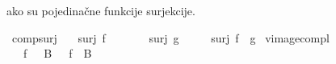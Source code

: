 \begin{isabellebody}
\begin{exercise}[subtitle=Svojstva funkcija]
\begin{isamarkuptext}
      ako su pojedinačne funkcije surjekcije.%
\end{isamarkuptext}\isamarkuptrue%
\isamarkupfalse%
\ comp{\isacharunderscore}{\kern0pt}surj{\isacharcolon}{\kern0pt}\isanewline
\ \ \ {\isachardoublequoteopen}surj\ f{\isachardoublequoteclose}\isanewline
\ \ \ \ \ \ \ {\isachardoublequoteopen}surj\ g{\isachardoublequoteclose}\isanewline
\ \ \ \ \ {\isachardoublequoteopen}surj\ {\isacharparenleft}{\kern0pt}f\ {\isasymcirc}\ g{\isacharparenright}{\kern0pt}{\isachardoublequoteclose}%
\isadelimproof
%
\endisadelimproof
%
\isatagproof
%
\endisatagproof
{\isafoldproof}%
%
\isadelimproof
%
\endisadelimproof
\isanewline
{}\isamarkupfalse%
\ vimage{\isacharunderscore}{\kern0pt}compl{\isacharcolon}{\kern0pt}\ \isanewline
\ \ \ {\isachardoublequoteopen}f\ {\isacharminus}{\kern0pt}{\isacharbackquote}{\kern0pt}\ {\isacharparenleft}{\kern0pt}{\isacharminus}{\kern0pt}\ B{\isacharparenright}{\kern0pt}\ {\isacharequal}{\kern0pt}\ {\isacharminus}{\kern0pt}\ {\isacharparenleft}{\kern0pt}f\ {\isacharminus}{\kern0pt}{\isacharbackquote}{\kern0pt}\ B{\isacharparenright}{\kern0pt}{\isachardoublequoteclose}%
\isadelimproof
%
\endisadelimproof
%
\isatagproof
%
\endisatagproof
{\isafoldproof}%
%
\isadelimproof
%
\endisadelimproof
%
\end{exercise}
%
\isadelimtheory
%
\endisadelimtheory
%
\isatagtheory
%
\endisatagtheory
{\isafoldtheory}%
%
\isadelimtheory
%
\endisadelimtheory
%
\end{isabellebody}%
\endinput
